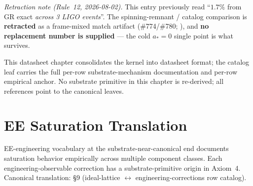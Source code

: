 \noindent\emph{Retraction note (Rule~12, 2026-08-02).} This entry previously read ``$1.7\%$ from GR exact \emph{across 3 LIGO events}''. The spinning-remnant / catalog comparison is \textbf{retracted} as a frame-mixed match artifact (\#774/\#780; ), and \textbf{no replacement number is supplied} --- the cold $a_* = 0$ single point is what survives.

This datasheet chapter consolidates the kernel into datasheet format; the catalog leaf carries the full per-row substrate-mechanism documentation and per-row empirical anchor. No substrate primitive in this chapter is re-derived; all references point to the canonical leaves.

\section{EE Saturation Translation}
\label{sec:vol9_ee_translation}

EE-engineering vocabulary at the substrate-near-canonical end documents saturation behavior empirically across multiple component classes. Each engineering-observable correction has a substrate-primitive origin in Axiom~4. Canonical translation:  \S 9 (ideal-lattice $\leftrightarrow$ engineering-corrections row catalog).

